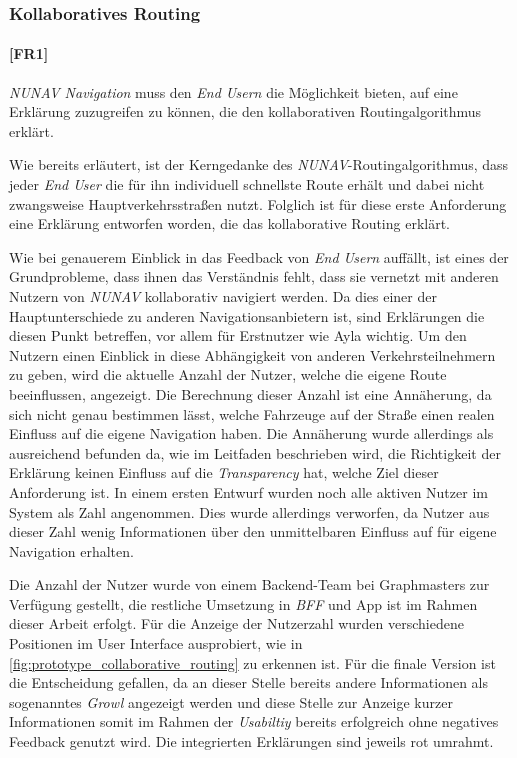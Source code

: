 \subsubsection{Kollaboratives Routing}
\label{sec:user_count_definition}

\paragraph{[FR1]} \textit{NUNAV Navigation} muss den \textit{End Usern} die Möglichkeit bieten, auf eine Erklärung zuzugreifen zu können, die den kollaborativen Routingalgorithmus erklärt.

\bigskip

Wie bereits erläutert, ist der Kerngedanke des \textit{NUNAV}-Routingalgorithmus, dass jeder \textit{End User} die für ihn individuell schnellste Route erhält und dabei nicht zwangsweise Hauptverkehrsstraßen nutzt. Folglich ist für diese erste Anforderung eine Erklärung entworfen worden, die das kollaborative Routing erklärt.

Wie bei genauerem Einblick in das Feedback von \textit{End Usern} auffällt, ist eines der Grundprobleme, dass ihnen das Verständnis fehlt, dass sie vernetzt mit anderen Nutzern von \textit{NUNAV} kollaborativ navigiert werden. Da dies einer der Hauptunterschiede zu anderen Navigationsanbietern ist, sind Erklärungen die diesen Punkt betreffen, vor allem für Erstnutzer wie Ayla wichtig. Um den Nutzern einen Einblick in diese Abhängigkeit von anderen Verkehrsteilnehmern zu geben, wird die aktuelle Anzahl der Nutzer, welche die eigene Route beeinflussen, angezeigt. Die Berechnung dieser Anzahl ist eine Annäherung, da sich nicht genau bestimmen lässt, welche Fahrzeuge auf der Straße einen realen Einfluss auf die eigene Navigation haben. Die Annäherung wurde allerdings als ausreichend befunden da, wie im Leitfaden beschrieben wird, die Richtigkeit der Erklärung keinen Einfluss auf die \textit{Transparency} hat, welche Ziel dieser Anforderung ist. In einem ersten Entwurf wurden noch alle aktiven Nutzer im System als Zahl angenommen. Dies wurde allerdings verworfen, da Nutzer aus dieser Zahl wenig Informationen über den unmittelbaren Einfluss auf für eigene Navigation erhalten.

Die Anzahl der Nutzer wurde von einem Backend-Team bei Graphmasters zur Verfügung gestellt, die restliche Umsetzung in \textit{BFF} und App ist im Rahmen dieser Arbeit erfolgt. Für die Anzeige der Nutzerzahl wurden verschiedene Positionen im User Interface ausprobiert, wie in \autoref{fig:prototype_collaborative_routing} zu erkennen ist. Für die finale Version ist die Entscheidung gefallen, da an dieser Stelle bereits andere Informationen als sogenanntes \textit{Growl} angezeigt werden und diese Stelle zur Anzeige kurzer Informationen somit im Rahmen der \textit{Usabiltiy} bereits erfolgreich ohne negatives Feedback genutzt wird. Die integrierten Erklärungen sind jeweils rot umrahmt.

